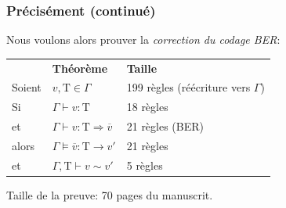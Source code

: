\documentclass[compress,dvips,xcolor={dvipsnames},t]{beamer}
\begin{document}
\begin{frame}
\frametitle{Précisément (continué)}

\noindent Nous voulons alors prouver la {\em correction du codage
  BER}:

\bigskip

\begin{tabular}{ll|l}
& {\bf Théorème} & \hspace*{10mm} {\bf Taille} \\
Soient & $v, \textrm{T} \in \Gamma$ & 199 règles (réécriture vers $\Gamma$) \\
Si     & $\Gamma \vdash v : \textrm{T}$ & 18 règles \\
et     & $\Gamma \vdash v : \textrm{T}
         \Rightarrow \overline{v}$ & 21 règles (BER) \\
alors  & $\Gamma \models \overline{v} : \textrm{T}
         \rightarrow v'$ & 21 règles \\
et     & $\Gamma, \textrm{T} \vdash v \sim v'$ & 5 règles \\
\end{tabular}

\bigskip \bigskip

\noindent Taille de la preuve: 70 pages du manuscrit.

\end{frame}
\end{document}
